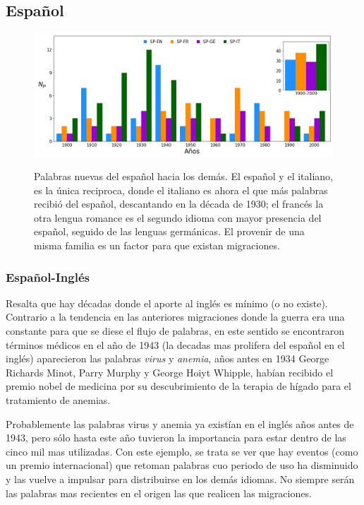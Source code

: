 \subsection{Español}%

\begin{figure}[h!]
	\centering
	\includegraphics[scale=.38]{Cap_3/NC_SP.png}
	\label{fig.NC_SP}
	\caption{Palabras nuevas del español hacia los demás. El español y el italiano, es la única reciproca, donde  el italiano es ahora el que más palabras recibió del español, descantando en la década de 1930; el francés la otra lengua romance es el segundo idioma con mayor presencia del español, seguido de las lenguas germánicas. El provenir de una misma familia es un factor para que existan migraciones.}
\end{figure}

\subsubsection*{Español-Inglés}%

Resalta que hay décadas donde el aporte al inglés es mínimo (o no existe). Contrario a la tendencia en las anteriores migraciones donde la guerra era una constante para que se diese el flujo de palabras, en este sentido se encontraron términos médicos en el año de 1943 (la decadas mas prolifera del español en el inglés) aparecieron las palabras \textit{virus} y \textit{anemia}, años antes en 1934 George Richards Minot, Parry Murphy y George Hoiyt Whipple, habían recibido el premio nobel de medicina por su descubrimiento de la terapia de hígado para el tratamiento de anemias.   

Probablemente las palabras virus y anemia ya existían en el inglés años antes de 1943,  pero sólo hasta este año tuvieron la importancia para estar dentro de las cinco mil mas utilizadas. Con este ejemplo, se trata se ver que hay eventos (como un premio internacional) que retoman palabras cuo periodo de uso  ha disminuido y las vuelve a impulsar para distribuirse en los demás idiomas.   No siempre serán las palabras mas recientes en el origen las que realicen las migraciones. 

